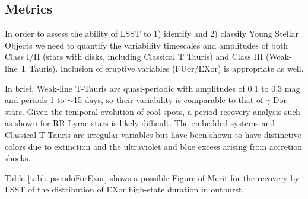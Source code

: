 






\subsection{Metrics}
\label{sec:\secname:metrics}

In order to assess the ability of LSST to 1) identify and 2) classify
Young Stellar Objects we need to quantify the variability timescales
and amplitudes of both Class I/II (stars with disks, including
Classical T Tauris) and Class III (Weak-line T Tauris).  Inclusion of
eruptive variables (FUor/EXor) is appropriate as well.

In brief, Weak-line T-Tauris are quasi-periodic with amplitudes of 0.1
to 0.3 mag and periods 1 to $\sim$15 days, so their variability is
comparable to that of $\gamma$ Dor stars. Given the temporal evolution
of cool spots, a period recovery analysis such as shown for RR Lyrae
stars is likely difficult.  The embedded systems and Classical T
Tauris are irregular variables but have been shown to have distinctive
colors due to extinction and the ultraviolet and blue excess arising
from accretion shocks.

Table \ref{table:pseudoForExor} shows a possible Figure of Merit for the recovery by LSST of the distribution of EXor high-state duration in outburst.


